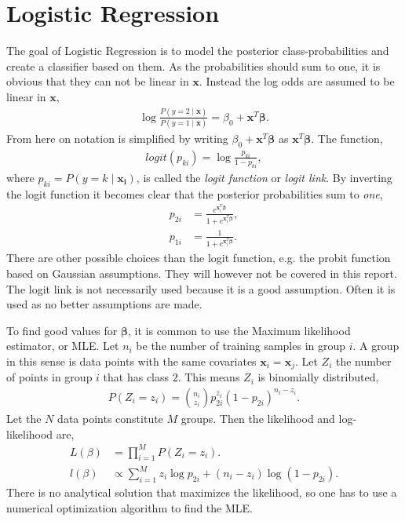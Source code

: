 \section{Logistic Regression}
\label{sec:Logistic Regression}
The goal of Logistic Regression is to model the posterior class-probabilities and create a classifier based on them. As the probabilities should sum to one, it is obvious that they can not be linear in $\mathbf{x}$. Instead the log odds are assumed to be linear in $\mathbf{x}$,
\begin{align}
  \label{eq:logclass} 
   \log \frac{P(y=2\mid \mathbf{x})}{P(y=1\mid \mathbf{x})} = \beta_0 + \mathbf{x}^T\bm \beta.
\end{align}
From here on notation is simplified by writing $\beta_0 + \mathbf{x}^T \bm \beta$ as $\mathbf{x}^T \bm \beta$.
The function,
\begin{align}
  logit(p_{ki}) = \log  \frac{p_{ki}}{1-p_{ki}},
\end{align}
where $p_{ki} = P(y=k\mid \mathbf{x_i})$, is called the \textit{logit function} or \textit{logit link}. By inverting the logit function it becomes clear that the posterior probabilities sum to \textit{one},
\begin{align}
  p_{2i} &=  \frac{e^{\mathbf{x}_i^T\bm \beta}}{1 + e^{\mathbf{x}_i^T\bm \beta}}, \\
  p_{1i} &=  \frac{1}{1 + e^{\mathbf{x}_i^T\bm \beta}}.
\end{align}
There are other possible choices than the logit function, e.g. the probit function based on Gaussian assumptions. They will however not be covered in this report. 
The logit link is not necessarily used because it is a good assumption. Often it is used as no better assumptions are made.

To find good values for $\bm \beta$, it is common to use the Maximum likelihood estimator, or MLE. Let $n_i$ be the number of training samples in group $i$. A group in this sense is data points with the same covariates $\mathbf{x}_i = \mathbf{x}_j$. Let $Z_i$ the number of points in group $i$ that has class $2$. This means $Z_i$ is binomially distributed,
\begin{align}
  P(Z_i = z_i) = \binom{n_i}{z_i} p_{2i}^{z_i} (1-p_{2i})^{n_i - z_i}.
\end{align}
Let the $N$ data points constitute $M$ groups. Then the likelihood and log-likelihood are,
\begin{align}
  L(\beta) &= \prod_{i = 1}^{M} P(Z_i = z_i). \\
  l(\beta) &\propto \sum^{M}_{i=1} z_i \log p_{2i} + (n_i - z_i) \log (1- p_{2i}).
\end{align}
There is no analytical solution that maximizes the likelihood, so one has to use a numerical optimization algorithm to find the MLE.  


